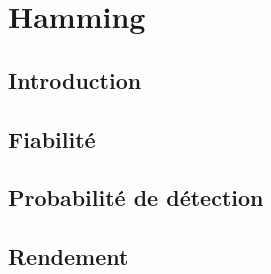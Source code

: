
\chapter{Hamming}

    \section{Introduction}

        \paragraph{}


    \section{Fiabilité}

        \paragraph{}


    \section{Probabilité de détection}

        \paragraph{}


    \section{Rendement}

        \paragraph{}
